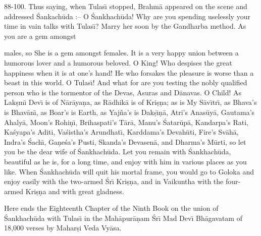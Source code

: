 88-100. Thus saying, when Tulas\={\i} stopped, Brahm\=a appeared on the scene and addressed \'Sankach\=uda :-- O \'Sankhach\=uda! Why are you spending uselessly your time in vain talks with Tulas\={\i}? Marry her soon by the Gandharba method. As you are a gem amongst

males, so She is a gem amongst females. It is a very happy union between a humorous lover and a humorous beloved. O King! Who despises the great happiness when it is at one's hand! He who forsakes the pleasure is worse than a beast in this world. O Tulas\={\i}! And what for are you testing the nobly qualified person who is the tormentor of the Devas, Asuras and D\=anavas. O Child! As Lak\d{s}m\={\i} Dev\={\i} is of N\=ar\=aya\d{n}a, as R\=adhik\=a is of Kri\d{s}\d{n}a; as is My S\=av\={\i}tr\={\i}, as Bhava's is Bhav\=an\={\i}, as Boar's is Earth, as Yaj\~na's is Dak\d{s}\={\i}\d{n}\=a, Atri's Anas\=uy\=a, Gautama's Ahaly\=a, Moon's Rohi\d{n}\={\i}, Brihaspati's T\=ar\=a, Manu's \'Satar\=up\=a, Kandarpa's Rati, Ka\'syapa's Aditi, Va\'sistha's Arundhat\={\i}, Karddama's Devah\=uti, Fire's Sv\=ah\=a, Indra's \'Sach\={\i}, Ga\d{n}e\'sa's Pusti, Skanda's Devasen\=a, and Dharma's M\=urti, so let you be the dear wife of \'Sankhach\=uda. Let you remain with \'Sankhach\=uda, beautiful as he is, for a long time, and enjoy with him in various places as you like. When \'Sankhach\=uda will quit his mortal frame, you would go to Goloka and enjoy easily with the two-armed \'Sr\={\i} Kri\d{s}\d{n}a, and in Vaikuntha with the four-armed Kri\d{s}\d{n}a and with great gladness.

Here ends the Eighteenth Chapter of the Ninth Book on the union of \'Sankhach\=uda with Tulas\={\i} in the Mah\=apur\=a\d{n}am \'Sr\={\i} Mad Dev\={\i} Bh\=agavatam of 18,000 verses by Mahar\d{s}i Veda Vy\=asa.



